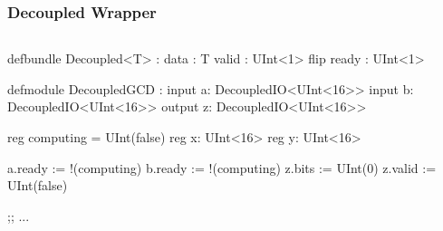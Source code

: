 \documentclass[xcolor=pdflatex,dvipsnames,table]{beamer}
\begin{document}
\begin{frame}[fragile]
\frametitle{Decoupled Wrapper}

\begin{columns}


\begin{footnotesize}
\begin{stanza}
defbundle Decoupled<T> :
  data : T
  valid : UInt<1>
  flip ready : UInt<1>

defmodule DecoupledGCD :
   input  a: DecoupledIO<UInt<16>>
   input  b: DecoupledIO<UInt<16>>
   output z: DecoupledIO<UInt<16>>

   reg computing = UInt(false)
   reg x: UInt<16>
   reg y: UInt<16>

   a.ready := !(computing)
   b.ready := !(computing)
   z.bits  := UInt(0)
   z.valid := UInt(false)

   ;; ...
\end{stanza}
\end{footnotesize}



\end{columns}
\end{frame}
\end{document}
